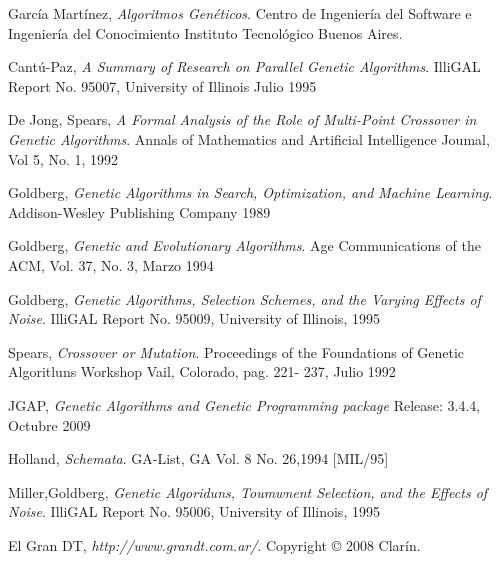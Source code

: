 \documentclass[pdftex,a4paper,10.5pt]{article}
\begin{document}
\begin{thebibliography}{9}

 García Mart\'inez,
 \emph{Algoritmos Gen\'eticos}.
 Centro de Ingenier\'ia del Software e Ingenier\'ia del Conocimiento
 Instituto Tecnológico Buenos Aires. 

 Cant\'u-Paz,
 \emph{A Summary of Research on Parallel Genetic Algorithms}.
 IlliGAL Report No. 95007, University of Illinois
 Julio 1995

 De Jong, Spears,
 \emph{A Formal Analysis of the Role of Multi-Point Crossover in Genetic Algorithms}.
Annals of Mathematics and Artificial Intelligence Joumal,
 Vol 5, No. 1, 1992

 Goldberg,
 \emph{Genetic Algorithms in Search, Optimization, and Machine Learning}.
 Addison-Wesley Publishing Company
 1989
 
 Goldberg,
 \emph{Genetic and Evolutionary Algorithms}.
 Age Communications of the
 ACM, Vol. 37, No. 3, 
 Marzo 1994

 Goldberg,
 \emph{Genetic Algorithms, Selection Schemes, and the Varying Effects of Noise}.
 IlliGAL Report No. 95009, 
 University of Illinois, 
 1995
 
 Spears,
 \emph{Crossover or Mutation}.
 Proceedings of the Foundations of Genetic Algoritluns Workshop Vail, Colorado, pag. 221- 237,
 Julio 1992
 
 JGAP, 
 \emph{Genetic Algorithms and Genetic Programming package}
 Release: 3.4.4,
 Octubre 2009
 

 Holland,
 \emph{Schemata}.
  GA-List, GA Vol. 8 No. 26,1994 [MIL/95]
  
 Miller,Goldberg, 
 \emph{Genetic Algoriduns, Toumwnent Selection, and the Effects of Noise}.
 IlliGAL Report No. 95006, University of Illinois, 1995
 
 El Gran DT, 
 \emph{http://www.grandt.com.ar/}.
 Copyright © 2008 Clarín.
  

  
\end{thebibliography}

\end{document}
